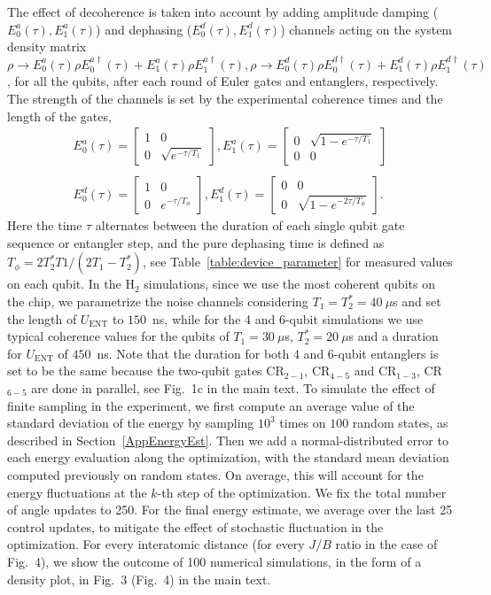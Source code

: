 \documentclass[twocolumn]{revtex4-1}
\newcommand{\1}{\mathbbm{1}}
\begin{document}
The effect of decoherence is taken into account by adding amplitude damping ($E^a_0(\tau),E^a_1(\tau)$) and dephasing ($E^d_0(\tau),E^d_1(\tau)$) channels acting on the system density matrix $\rho\rightarrow E^a_0(\tau) \rho E^{a\dag}_0(\tau)+E^a_1(\tau) \rho E^{a\dag}_1(\tau),\rho\rightarrow E^d_0(\tau) \rho E^{d\dag}_0(\tau)+E^d_1(\tau) \rho E^{d\dag}_1(\tau)$, for all the qubits, after each round of Euler gates and entanglers, respectively.  The strength of the channels is set by the experimental coherence times and the length of the gates,
\begin{align}
E^a_0(\tau)=\begin{bmatrix}
    1      & 0 \\
    0    & \sqrt{e^{-\tau/T_1}} 
\end{bmatrix},
E^a_1(\tau)=\begin{bmatrix}
    0      & \sqrt{1-e^{-\tau/T_1}} \\
    0    & 0 
\end{bmatrix}\\
\nonumber\\
E^d_0(\tau)=\begin{bmatrix}
    1      & 0 \\
    0    & e^{-\tau/T_\phi} 
\end{bmatrix},
E^d_1(\tau)=\begin{bmatrix}
    0      &0 \\
    0    &  \sqrt{1-e^{-2\tau/T_\phi}}
\end{bmatrix}.
\end{align}
Here the time $\tau$ alternates between the duration of each single qubit gate sequence or entangler step, and the pure dephasing time is defined as $T_\phi=2T_2^*T1/(2T_1-T_2^*)$, see 
Table~\ref{table:device_parameter} for measured values on each qubit. 
In the $\textrm{H}_2$ simulations, since we use the most coherent qubits on the chip, we parametrize the noise channels considering $T_1=T_2^*=40~\mu$s and set the length of $U_{\textrm{ENT}}$ to $150$~ns, while for the 4 and 6-qubit simulations we use typical coherence values for the qubits of $T_1=30~\mu$s, $T_2^*=20~\mu$s and a duration for $U_{\textrm{ENT}}$ of $450$~ns. Note that the duration for both 4 and 6-qubit entanglers is set to be the same because the two-qubit gates CR$_{2-1}$, CR$_{4-5}$ and CR$_{1-3}$, CR$_{6-5}$ are done in parallel, see Fig.~1c in the main text.
To simulate the effect of finite sampling in the experiment, we first compute an average value of the standard deviation of the energy by sampling $10^3$ times on $100$ random states, as described in Section~\ref{AppEnergyEst}. Then we add a normal-distributed error to each energy evaluation along the optimization, with the standard mean deviation computed previously on random states. On average, this will account for the energy fluctuations at the $k$-th step of the optimization. We fix the total number of angle updates to 250. For the final energy estimate, we average over the last 25 control updates, to mitigate the effect of stochastic fluctuation in the optimization. For every interatomic distance (for every $J/B$ ratio in the case of Fig.~4), we show the outcome of 100 numerical simulations, in the form of a density plot, in Fig.~3 (Fig.~4) in the main text.
\end{document}
